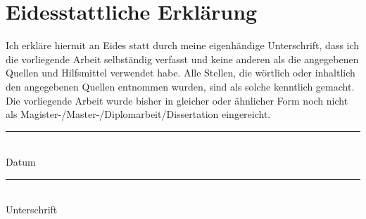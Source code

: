 \documentclass[11pt,a4paper,titlepage, twoside]{report}
\makeatletter
\def\cleardoublepage{\clearpage\if@twoside \ifodd\c@page\else
    \hbox{}
    \thispagestyle{empty}
    \newpage
    \if@twocolumn\hbox{}\newpage\fi\fi\fi}
\makeatother
\begin{document}
\section*{Eidesstattliche Erklärung}
Ich erkläre hiermit an Eides statt durch meine eigenhändige Unterschrift, dass ich die vorliegende Arbeit selbständig verfasst und keine anderen als die angegebenen Quellen und Hilfsmittel verwendet habe.
Alle Stellen, die wörtlich oder inhaltlich den angegebenen Quellen entnommen wurden, sind als solche kenntlich gemacht.\\

Die vorliegende Arbeit wurde bisher in gleicher oder ähnlicher Form noch nicht als Magister-/Master-/Diplomarbeit/Dissertation eingereicht.\\[3cm]

\begin{minipage}{0.4\textwidth}
  \centering
  \rule{\textwidth}{.4pt}\\
  Datum
\end{minipage}%
\hfill%
\begin{minipage}{0.4\textwidth}
  \centering
  \rule{\textwidth}{.4pt}\\
  Unterschrift
\end{minipage}



\cleardoublepage
{}
\begin{abstract}
This is the English abstract.
\end{abstract}




\cleardoublepage
\pagestyle{fancy}
\tableofcontents
\end{document}
